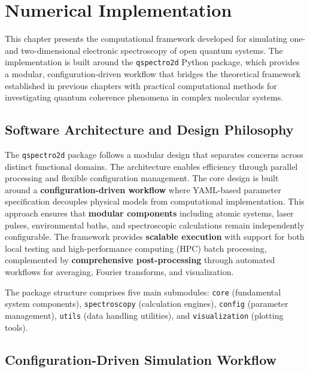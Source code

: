\chapter{Numerical Implementation}
\label{chap:numerical_implementation}

\noindent
This chapter presents the computational framework developed for simulating one- and two-dimensional electronic spectroscopy of open quantum systems. The implementation is built around the \texttt{qspectro2d} Python package, which provides a modular, configuration-driven workflow that bridges the theoretical framework established in previous chapters with practical computational methods for investigating quantum coherence phenomena in complex molecular systems.

\section{Software Architecture and Design Philosophy}
\label{sec:software_architecture}

\noindent
The \texttt{qspectro2d} package follows a modular design that separates concerns across distinct functional domains. The architecture enables efficiency through parallel processing and flexible configuration management. The core design is built around a \textbf{configuration-driven workflow} where YAML-based parameter specification decouples physical models from computational implementation. This approach ensures that \textbf{modular components} including atomic systems, laser pulses, environmental baths, and spectroscopic calculations remain independently configurable. The framework provides \textbf{scalable execution} with support for both local testing and high-performance computing (HPC) batch processing, complemented by \textbf{comprehensive post-processing} through automated workflows for averaging, Fourier transforms, and visualization.

\noindent
The package structure comprises five main submodules: \texttt{core} (fundamental system components), \texttt{spectroscopy} (calculation engines), \texttt{config} (parameter management), \texttt{utils} (data handling utilities), and \texttt{visualization} (plotting tools).

\section{Configuration-Driven Simulation Workflow}
\label{sec:configuration_workflow}

